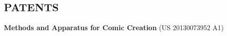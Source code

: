\documentclass[line,margin]{res}
\begin{document}
\begin{resume}







\section{PATENTS}

\newcommand{\patent}[2] {
	\textbf{#1} (#2)
}

\patent
{Methods and Apparatus for Comic Creation}
{US 20130073952 A1}








\end{resume}
\end{document}
